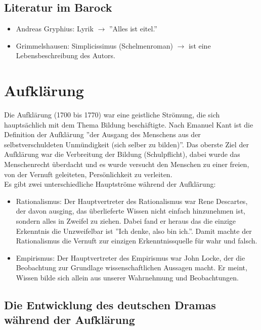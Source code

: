 \documentclass[12pt,a4paper]{article}
\begin{document}
\subsection{Literatur im Barock}
\begin{itemize}
\item Andreas Gryphius: Lyrik $\rightarrow$ ''Alles ist eitel.''
\item Grimmelshausen: Simplicissimus (Schelmenroman) $\rightarrow$ ist eine Lebensbeschreibung des Autors.
\end{itemize}

\newpage

\section{Aufklärung}

Die Aufklärung (1700 bis 1770) war eine geistliche Strömung, die sich hauptsächlich mit dem Thema Bildung beschäftigte. Nach Emanuel Kant ist die Definition der Aufklärung ''der Ausgang des Menschens aus der selbstverschuldeten Unmündigkeit (sich selber zu bilden)''. Das oberste Ziel der Aufklärung war die Verbreitung der Bildung (Schulpflicht), dabei wurde das Menschenrecht überdacht und es wurde versucht den Menschen zu einer freien, von der Vernuft geleiteten, Persönlichkeit zu verleiten.\\

Es gibt zwei unterschiedliche Hauptströme während der Aufklärung:

	\begin{itemize}
	\item Rationalismus: Der Hauptvertreter des Rationalismus war Rene Descartes, der davon ausging, das überlieferte Wissen nicht einfach hinzunehmen ist, sondern alles in Zweifel zu ziehen. Dabei fand er heraus das die einzige Erkenntnis die Unzweifelbar ist ''Ich denke, also bin ich.''. Damit machte der Rationalismus die Vernuft zur einzigen Erkenntnissquelle für wahr und falsch.
	
	\item Empirismus: Der Hauptvertreter des Empirismus war John Locke, der die Beobachtung zur Grundlage wissenschaftlichen Aussagen macht. Er meint, Wissen bilde sich allein aus unserer Wahrnehmung und Beobachtungen.
	\end{itemize}

\subsection{Die Entwicklung des deutschen Dramas während der Aufklärung}
\end{document}
